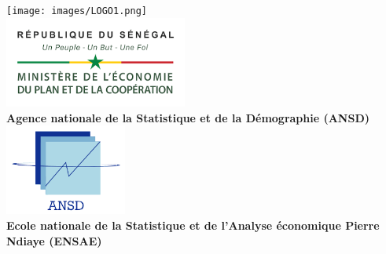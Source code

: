 \documentclass[
]{article}
\author{}
\date{\vspace{-2.5em}}
\begin{document}
\begin{titlepage}
    \begin{center}
        \texttt{[image: images/LOGO1.png]} \\[0.1cm]  
        
        \includegraphics[width=6cm]{images/LOGO2.png} \\[0.1cm] 
        
        \textbf{\large Agence nationale de la Statistique et de la Démographie (ANSD)}\\[0.2cm]
        
        \includegraphics[width=4cm]{images/LOGO3.png} \\[0.1cm]
        
        \textbf{\large Ecole nationale de la Statistique et de l'Analyse économique Pierre Ndiaye (ENSAE)}\\[0.4cm]
        

\end{center}
\end{titlepage}
\end{document}
